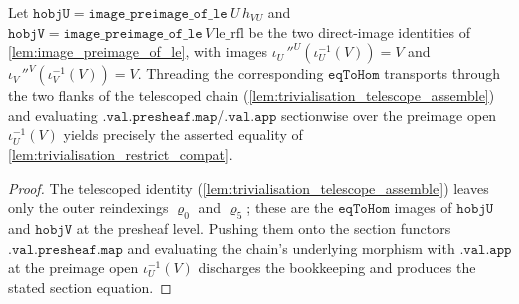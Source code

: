 \begin{lemma}

  \label{lem:trivialisation_restrict_sectionwise}
  Let \(\mathtt{hobjU} = \mathtt{image\_preimage\_of\_le}\,U\,h_{VU}\) and
  \(\mathtt{hobjV} = \mathtt{image\_preimage\_of\_le}\,V\,\mathrm{le\_rfl}\) be the two direct-image
  identities of \cref{lem:image_preimage_of_le}, with images \(\iota_U\,''^U(\iota_U^{-1}(V)) = V\) and
  \(\iota_V\,''^V(\iota_V^{-1}(V)) = V\). Threading the corresponding \(\mathtt{eqToHom}\) transports
  through the two flanks of the telescoped chain (\cref{lem:trivialisation_telescope_assemble}) and
  evaluating \(\mathtt{.val.presheaf.map}\)/\(\mathtt{.val.app}\) sectionwise over the preimage open
  \(\iota_U^{-1}(V)\) yields precisely the asserted equality of
  \cref{lem:trivialisation_restrict_compat}.
\end{lemma}
\begin{proof}
  \leanok
  The telescoped identity (\cref{lem:trivialisation_telescope_assemble}) leaves only the outer
  reindexings \(\varrho_0\) and \(\varrho_5\); these are the \(\mathtt{eqToHom}\) images of
  \(\mathtt{hobjU}\) and \(\mathtt{hobjV}\) at the presheaf level. Pushing them onto the section
  functors \(\mathtt{.val.presheaf.map}\) and evaluating the chain's underlying morphism with
  \(\mathtt{.val.app}\) at the preimage open \(\iota_U^{-1}(V)\) discharges the bookkeeping and produces
  the stated section equation.
\end{proof}

